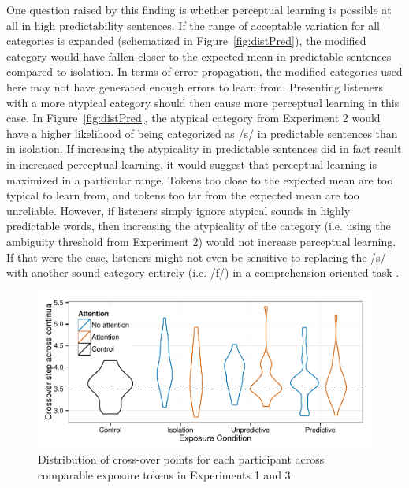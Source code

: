 One question raised by this finding is whether perceptual learning is possible at all in high predictability sentences.
If the range of acceptable variation for all categories is expanded (schematized in Figure~\ref{fig:distPred}), the modified category would have fallen closer to the expected mean in predictable sentences compared to isolation.
In terms of error propagation, the modified categories used here may not have generated enough errors to learn from.
Presenting listeners with a more atypical category should then cause more perceptual learning in this case.
In Figure~\ref{fig:distPred}, the atypical category from Experiment 2 would have a higher likelihood of being categorized as /s/ in predictable sentences than in isolation.
If increasing the atypicality in predictable sentences did in fact result in increased perceptual learning, it would suggest that perceptual learning is maximized in a particular range.
Tokens too close to the expected mean are too typical to learn from, and tokens too far from the expected mean are too unreliable.
However, if listeners simply ignore atypical sounds in highly predictable words, then increasing the atypicality of the category (i.e. using the ambiguity threshold from Experiment 2) would not increase perceptual learning.
If that were the case, listeners might not even be sensitive to replacing the /s/ with another sound category entirely (i.e. /f/) in a comprehension-oriented task \citep[but see][]{Samuel1981}.


\begin{figure}[!ht]
\centering
\caption{Distribution of cross-over points for each participant across comparable exposure tokens in Experiments 1 and 3.}
\label{fig:exp13xoverdist}
\begin{center}
\includegraphics[width=\textwidth]{graphs/exp13_xoverdist}
\end{center}
\end{figure}

